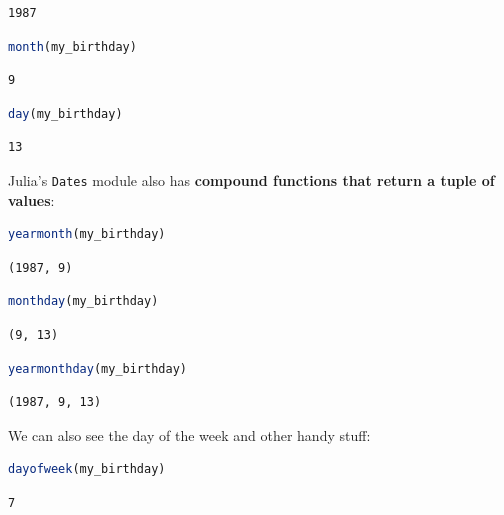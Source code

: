 \documentclass[
  notoc %
]{tufte-book}
\newcommand{\passthrough}[1]{#1}
\begin{document}
\begin{lstlisting}[language=Output]
1987
\end{lstlisting}

\begin{lstlisting}[language=Julia]
month(my_birthday)
\end{lstlisting}

\begin{lstlisting}[language=Output]
9
\end{lstlisting}

\begin{lstlisting}[language=Julia]
day(my_birthday)
\end{lstlisting}

\begin{lstlisting}[language=Output]
13
\end{lstlisting}

Julia's \passthrough{\lstinline!Dates!} module also has \textbf{compound
functions that return a tuple of values}:

\begin{lstlisting}[language=Julia]
yearmonth(my_birthday)
\end{lstlisting}

\begin{lstlisting}[language=Output]
(1987, 9)
\end{lstlisting}

\begin{lstlisting}[language=Julia]
monthday(my_birthday)
\end{lstlisting}

\begin{lstlisting}[language=Output]
(9, 13)
\end{lstlisting}

\begin{lstlisting}[language=Julia]
yearmonthday(my_birthday)
\end{lstlisting}

\begin{lstlisting}[language=Output]
(1987, 9, 13)
\end{lstlisting}

We can also see the day of the week and other handy stuff:

\begin{lstlisting}[language=Julia]
dayofweek(my_birthday)
\end{lstlisting}

\begin{lstlisting}[language=Output]
7
\end{lstlisting}
\end{document}
